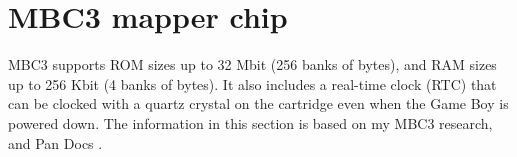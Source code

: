 \chapter{MBC3 mapper chip}

MBC3 supports ROM sizes up to 32 Mbit (256 banks of  bytes), and RAM
sizes up to 256 Kbit (4 banks of  bytes). It also includes a
real-time clock (RTC) that can be clocked with a quartz crystal on the
cartridge even when the Game Boy is powered down. The information in this
section is based on my MBC3 research, and Pan Docs \cite{pandocs}.
